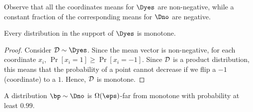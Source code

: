 Observe that all the coordinates means for $\Dyes$ are non-negative, while
a constant fraction of the corresponding means for $\Dno$ are negative.

% 
% 
% 
\begin{lemma}\label{lem:mon-dist}
Every distribution in the support of $\Dyes$ is monotone.  
\end{lemma}

\begin{proof} Consider $\cD \sim \Dyes$. Since the mean vector is non-negative, for each coordinate $x_i$,
$\Pr[x_i = 1] \geq \Pr[x_i = -1]$. Since $\mathcal{D}$ is a product distribution, this means that the probability
of a point cannot decrease if we flip a $-1$ (coordinate) to a $1$. Hence, $\mathcal{D}$ is monotone.
\end{proof}

\begin{lemma}\label{lem:far-mon-dist}
A distribution $\bp \sim \Dno$ is $\Omega(\eps)$-far from monotone with probability at least $0.99$.
\end{lemma}


